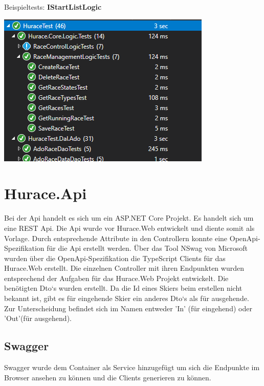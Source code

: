 \documentclass[a4paper, 12pt]{article}
\begin{document}
	Beispieltests:
	\textbf{IStartListLogic}
	
	
	
	\includegraphics[width=.7\textwidth]{img/UnitTests2.png}

	\newpage
	
	\section{Hurace.Api}
	Bei der Api handelt es sich um ein ASP.NET Core Projekt. Es handelt sich um eine REST Api. Die Api wurde vor Hurace.Web entwickelt und diente somit als Vorlage. Durch entsprechende Attribute in den Controllern konnte eine OpenApi-Spezifikation für die Api erstellt werden. Über das Tool NSwag von Microsoft wurden über die OpenApi-Spezifikation die TypeScript Clients für das Hurace.Web erstellt. Die einzelnen Controller mit ihren Endpunkten wurden entsprechend der Aufgaben für das Hurace.Web Projekt entwickelt. Die benötigten Dto`s wurden erstellt. Da die Id eines Skiers beim erstellen nicht bekannt ist, gibt es für eingehende Skier ein anderes Dto`s als für ausgehende. Zur Unterscheidung befindet sich im Namen entweder 'In' (für eingehend) oder 'Out'(für ausgehend). 
	\subsection{Swagger}
	Swagger wurde dem Container als Service hinzugefügt um sich die Endpunkte im Browser ansehen zu können und die Clients generieren zu können.
\end{document}
